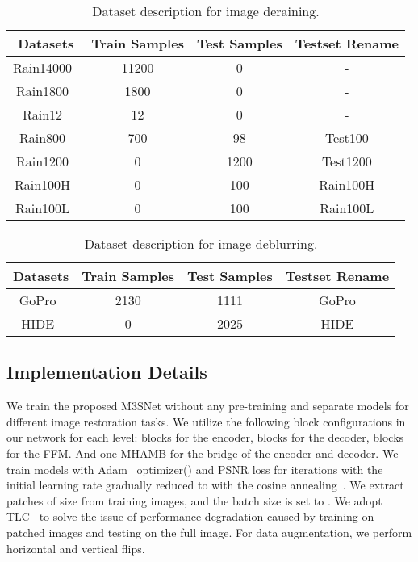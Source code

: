 \documentclass[sn-mathphys,Numbered]{sn-jnl}
\theoremstyle{thmstyleone}\newtheorem{theorem}{Theorem}\newtheorem{proposition}[theorem]{Proposition}
\theoremstyle{thmstyletwo}\newtheorem{example}{Example}\newtheorem{remark}{Remark}
\theoremstyle{thmstylethree}\newtheorem{definition}{Definition}
\begin{document}
\begin{table}
\caption{ Dataset description for image deraining.
}
\label{tb:000}
\begin{tabular}{cccc}
    \hline
     Datasets &Train Samples &Test Samples &Testset Rename
    \\
    \hline\hline
     Rain14000~\cite{238099669} &11200 &0 & -
     \\
    Rain1800~\cite{81Yang2016DeepJR} &1800 &0 & -
        \\
    Rain12~\cite{487780668} &12 &0 &- 
    \\
    Rain800~\cite{90Zhang2017ImageDU} &700 & 98 &Test100
    \\
    Rain1200~\cite{DIDMDN} &0 &1200 &Test1200
    \\
    Rain100H~\cite{81Yang2016DeepJR} &0 &100 & Rain100H
    \\
    Rain100L~\cite{81Yang2016DeepJR} &0 &100 &Rain100L
    \\
    \hline
\end{tabular}
\end{table}

\begin{table}
\caption{ Dataset description for image deblurring.
}
\label{tb:001}
\begin{tabular}{cccc}
    \hline
     Datasets &Train Samples &Test Samples &Testset Rename
    \\
    \hline\hline
    GoPro~\cite{Gopro} &2130 &1111 & GoPro
    \\
    HIDE~\cite{HIDE} &0 &2025 &HIDE
    \\
    \hline
\end{tabular}
\end{table}
\subsection{Implementation Details}
We train the proposed M3SNet without any pre-training and separate models for different image restoration tasks. We utilize the following block configurations in our network for each level:  blocks for the encoder,  blocks for the decoder,  blocks for the FFM. And one MHAMB for the bridge of the encoder and decoder. 
We train models with Adam~\cite{2014Adam} optimizer() and PSNR loss for  iterations with the initial learning rate  gradually reduced to   with the cosine annealing~\cite{2016SGDR}. We extract patches of size  from training images, and the batch size is set to . We adopt TLC~\cite{Chu2021ImprovingIR} to solve the issue of performance degradation caused by training on patched images and testing on the full image. For data augmentation, we perform horizontal and vertical flips. 
\end{document}
